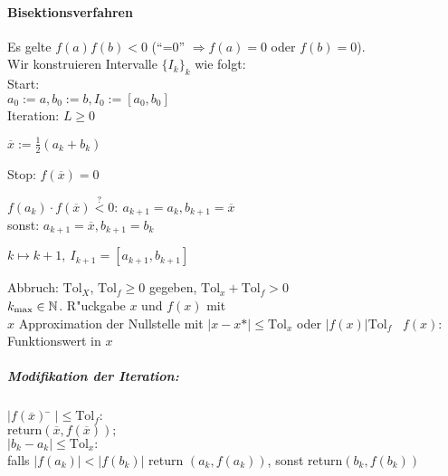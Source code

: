 \documentclass{scrartcl}
\begin{document}
\paragraph{Bisektionsverfahren} 
Es gelte $f(a) f(b) < 0$  ("`=0"' $\Rightarrow f(a) = 0$ oder $f(b) = 0$). \\
Wir konstruieren Intervalle $\{ I_k \}_k$ wie folgt: \\
Start: \\
$a_0 := a, b_0 := b, I_0 := [a_0, b_0]$ \\
Iteration: $L \geq 0$
\begin{1aufz}
\item $\overline{x} := \frac{1}{2} (a_k + b_k)$ \\
\item Stop: $f(\overline{x}) = 0$ \\
\item $f(a_k) \cdot f(\overline{x}) \stackrel{?}{<} 0: \ a_{k+1} = a_k, b_{k+1} = \overline{x}$ \\
sonst: $a_{k+1} = \overline{x}, b_{k+1} = b_k$
\item $k \mapsto k+1, \ I_{k+1} = [a_{k+1}, b_{k+1} ]$
\end{1aufz}
Abbruch: $\mathrm{Tol}_X$, $\mathrm{Tol}_f \geq 0$ gegeben, $\mathrm{Tol}_x + \mathrm{Tol}_f > 0$ \\
$k_\mathrm{max} \in \mathbb{N}$. R"uckgabe $x$ und $f(x)$ mit \\
$x$ Approximation der Nullstelle mit $\vert x - x* \vert \leq \mathrm{Tol}_x$ oder $\vert f(x) \vert \mathrm{Tol}_f$ \
$f(x)$: Funktionswert in $x$
\subparagraph*{Modifikation der Iteration:}
\begin{tabbing}
$\vert f(\overline{x})$ \= $\vert \leq \mathrm{Tol}_f:$  \\ 
\> $\mathrm{return}(\overline{x}, f(\overline{x}));$ \\
$\vert b_k - a_k \vert \leq \mathrm{Tol}_x:$ \\
\> falls $ \vert f(a_k) \vert < \vert f(b_k) \vert$ return $(a_k, f(a_k))$, sonst return$(b_k, f(b_k))$
\end{tabbing}
\end{document}
